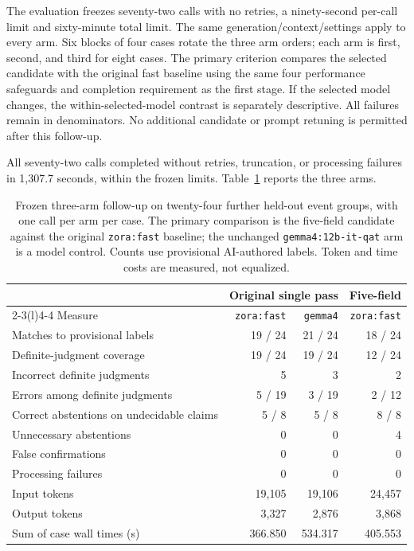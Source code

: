 The evaluation freezes seventy-two calls with no retries, a ninety-second per-call limit and sixty-minute total limit. The same generation/context/settings apply to every arm. Six blocks of four cases rotate the three arm orders; each arm is first, second, and third for eight cases. The primary criterion compares the selected candidate with the original fast baseline using the same four performance safeguards and completion requirement as the first stage. If the selected model changes, the within-selected-model contrast is separately descriptive. All failures remain in denominators. No additional candidate or prompt retuning is permitted after this follow-up.

All seventy-two calls completed without retries, truncation, or processing failures in 1,307.7 seconds, within the frozen limits. Table~\ref{tab:followup-semantic} reports the three arms.

\begin{table}[htbp]
\centering
\begin{tabular}{@{}lrrr@{}}
\toprule
& \multicolumn{2}{c}{Original single pass} & Five-field\\\cmidrule(lr){2-3}\cmidrule(l){4-4}
Measure & \texttt{zora:fast} & \texttt{gemma4} & \texttt{zora:fast}\\\midrule
Matches to provisional labels & 19 / 24 & 21 / 24 & 18 / 24\\
Definite-judgment coverage & 19 / 24 & 19 / 24 & 12 / 24\\
Incorrect definite judgments & 5 & 3 & 2\\
Errors among definite judgments & 5 / 19 & 3 / 19 & 2 / 12\\
Correct abstentions on undecidable claims & 5 / 8 & 5 / 8 & 8 / 8\\
Unnecessary abstentions & 0 & 0 & 4\\
False confirmations & 0 & 0 & 0\\
Processing failures & 0 & 0 & 0\\
Input tokens & 19,105 & 19,106 & 24,457\\
Output tokens & 3,327 & 2,876 & 3,868\\
Sum of case wall times (s) & 366.850 & 534.317 & 405.553\\
\bottomrule
\end{tabular}
\caption{Frozen three-arm follow-up on twenty-four further held-out event groups, with one call per arm per case. The primary comparison is the five-field candidate against the original \texttt{zora:fast} baseline; the unchanged \texttt{gemma4:12b-it-qat} arm is a model control. Counts use provisional AI-authored labels. Token and time costs are measured, not equalized.}
\label{tab:followup-semantic}
\end{table}

